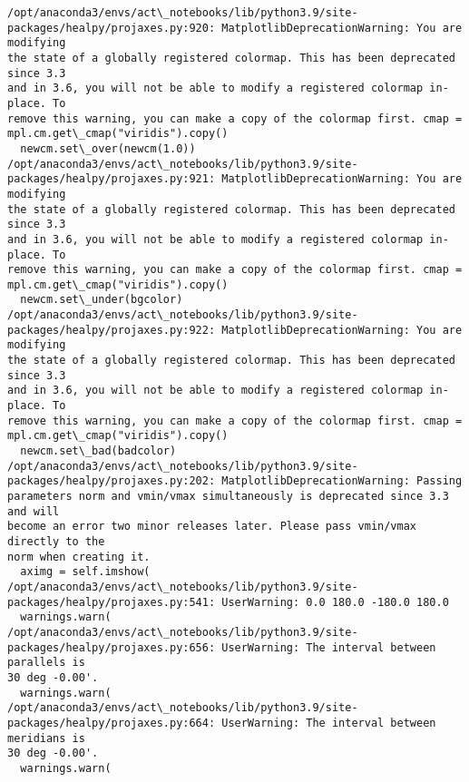 \documentclass[11pt]{article}
\begin{document}
    \begin{Verbatim}[commandchars=\\\{\}]
/opt/anaconda3/envs/act\_notebooks/lib/python3.9/site-
packages/healpy/projaxes.py:920: MatplotlibDeprecationWarning: You are modifying
the state of a globally registered colormap. This has been deprecated since 3.3
and in 3.6, you will not be able to modify a registered colormap in-place. To
remove this warning, you can make a copy of the colormap first. cmap =
mpl.cm.get\_cmap("viridis").copy()
  newcm.set\_over(newcm(1.0))
/opt/anaconda3/envs/act\_notebooks/lib/python3.9/site-
packages/healpy/projaxes.py:921: MatplotlibDeprecationWarning: You are modifying
the state of a globally registered colormap. This has been deprecated since 3.3
and in 3.6, you will not be able to modify a registered colormap in-place. To
remove this warning, you can make a copy of the colormap first. cmap =
mpl.cm.get\_cmap("viridis").copy()
  newcm.set\_under(bgcolor)
/opt/anaconda3/envs/act\_notebooks/lib/python3.9/site-
packages/healpy/projaxes.py:922: MatplotlibDeprecationWarning: You are modifying
the state of a globally registered colormap. This has been deprecated since 3.3
and in 3.6, you will not be able to modify a registered colormap in-place. To
remove this warning, you can make a copy of the colormap first. cmap =
mpl.cm.get\_cmap("viridis").copy()
  newcm.set\_bad(badcolor)
/opt/anaconda3/envs/act\_notebooks/lib/python3.9/site-
packages/healpy/projaxes.py:202: MatplotlibDeprecationWarning: Passing
parameters norm and vmin/vmax simultaneously is deprecated since 3.3 and will
become an error two minor releases later. Please pass vmin/vmax directly to the
norm when creating it.
  aximg = self.imshow(
/opt/anaconda3/envs/act\_notebooks/lib/python3.9/site-
packages/healpy/projaxes.py:541: UserWarning: 0.0 180.0 -180.0 180.0
  warnings.warn(
/opt/anaconda3/envs/act\_notebooks/lib/python3.9/site-
packages/healpy/projaxes.py:656: UserWarning: The interval between parallels is
30 deg -0.00'.
  warnings.warn(
/opt/anaconda3/envs/act\_notebooks/lib/python3.9/site-
packages/healpy/projaxes.py:664: UserWarning: The interval between meridians is
30 deg -0.00'.
  warnings.warn(
    \end{Verbatim}

    \begin{center}
    \end{center}
    { \hspace*{\fill} \\}
    
\end{document}
